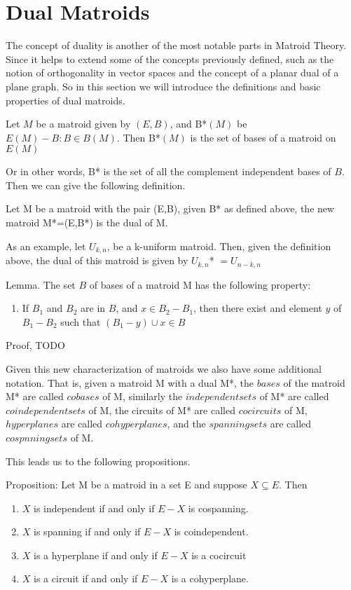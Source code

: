 \section{Dual Matroids}
The concept of duality is another of the most notable parts in Matroid Theory. Since it helps to extend some of the concepts previously defined, such as the notion of orthogonality in vector spaces and the concept of a planar dual of a plane graph. So in this section we will introduce the definitions and basic properties of dual matroids.

\begin{theorem}
    Let $M$ be a matroid given by $(E,B)$, and B*$(M)$ be ${E(M) - B:B\in B(M)}$. Then B*$(M)$ is the set of bases of a matroid on $E(M)$
\end{theorem}

Or in other words, B* is the set of all the complement independent bases of $B$. Then we can give the following definition.

\begin{defn}
    Let M be a matroid with the pair (E,B), given B* as defined above, the new matroid M*=(E,B*) is the dual of M.
\end{defn}

As an example, let $U_{k,n}$, be a k-uniform matroid. Then, given the definition above, the dual of this matroid is given by $U_{k,n}$* $= U_{n-k,n}$

Lemma. The set $B$ of bases of a matroid M has the following property:
\begin{enumerate}
    \item If $B_1$ and $B_2$ are in $B$, and $x\in B_2 - B_1$, then there exist and element $y$ of $B_1 - B_2$ such that $(B_1 - y) \cup x \in B$ 
\end{enumerate}

Proof, TODO


Given this new characterization of matroids we also have some additional notation. That is, given a matroid M with a dual M*, the $bases$ of the matroid M* are called $cobases$ of M, similarly the $independent sets$ of M* are called $coindependent sets$ of M, the circuits of M* are called $cocircuits$ of M, $hyperplanes$ are called $cohyperplanes$, and the $spanning sets$ are called $cospnning sets$ of M.

This leads us to the following propositions.

Proposition:
Let M be a matroid in a set E and suppose $X \subseteq E$. Then

    \begin{enumerate}
        \item $X$ is independent if and only if $E-X$ is cospanning.

        \item $X$ is spanning if and only if $E-X$ is coindependent.

        \item $X$ is a hyperplane if and only if $E-X$ is a cocircuit

        \item $X$ is a circuit if and only if $E-X$ is a cohyperplane.
    \end{enumerate}



